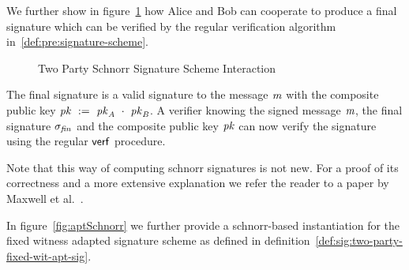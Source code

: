 We further show in figure~\ref{fig:twoparty-schnorr-prot} how Alice and Bob can cooperate to produce a final signature which can be verified by the regular verification algorithm in~\ref{def:pre:signature-scheme}.

\begin{figure}
    \centering
    \caption{Two Party Schnorr Signature Scheme Interaction}
    \label{fig:twoparty-schnorr-prot}
\end{figure}

The final signature is a valid signature to the message $\mathit{m}$ with the composite public key $\mathit{pk} ~:=~ \mathit{pk}_{\mathit{A}} ~\cdot~ \mathit{pk}_{\mathit{B}}$.
A verifier knowing the signed message $\mathit{m}$, the final signature $\sigma_{\mathit{fin}}$ and the composite public key $\mathit{pk}$ can now verify the signature using the regular $\mathsf{verf}$ procedure.

Note that this way of computing schnorr signatures is not new.
For a proof of its correctness and a more extensive explanation we refer the reader to a paper by Maxwell et al.~\cite{maxwell2019simple}.

In figure~\ref{fig:aptSchnorr} we further provide a schnorr-based instantiation for the fixed witness adapted signature scheme as defined in definition~\ref{def:sig:two-party-fixed-wit-apt-sig}.

